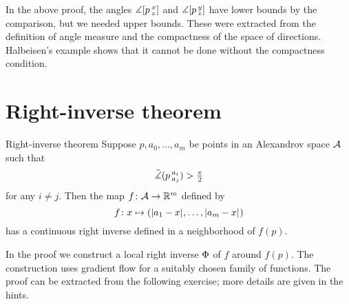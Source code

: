 In the above proof, the angles $\measuredangle[p\,{}^{x}_{z}]$ and $\measuredangle[p\,{}^{y}_{z}]$ have lower bounds by
the comparison, but we needed upper bounds.
These were extracted from the definition of angle measure and the compactness of the space of directions.
Halbeisen's example \cite[13.6]{alexander-kapovitch-petrunin2024} shows that it cannot be done without the compactness condition.

\section{Right-inverse theorem}

\begin{thm}{Right-inverse theorem}\label{thm:right-inverse}
Suppose $p,a_0,\dots,a_m$ be points in an Alexandrov space $\mathcal{A}$ such that
\[\tilde\measuredangle(p\,{}^{a_i}_{a_j})>\tfrac\pi2\]
for any $i\ne j$.
Then the map $f\colon\mathcal{A}\to\mathbb{R}^m$ defined by
\[f\colon x\mapsto (|{a_1}-{x}|_{}^{{}},\dots,|{a_m}-{x}|_{}^{{}})\]
has a  continuous right inverse defined in a neighborhood of $f(p)$.
\end{thm}

In the proof we construct a local right inverse $\Phi$ of $f$ around $f(p)$.
The construction uses gradient flow for a suitably chosen family of functions.
The proof can be extracted from the following exercise;
more details are given in the hints.

